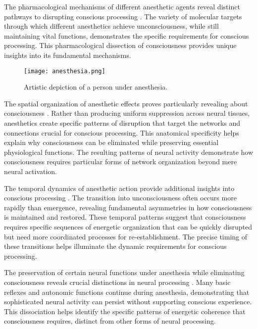 The pharmacological mechanisms of different anesthetic agents reveal distinct pathways to disrupting conscious processing \cite{Uhrig2018}. The variety of molecular targets through which different anesthetics achieve unconsciousness, while still maintaining vital functions, demonstrates the specific requirements for conscious processing. This pharmacological dissection of consciousness provides unique insights into its fundamental mechanisms.

\begin{figure}[h]
    \centering
    \texttt{[image: anesthesia.png]}

    \caption{Artistic depiction of a person under anesthesia. }
\end{figure}

The spatial organization of anesthetic effects proves particularly revealing about consciousness \cite{Lewis2012}. Rather than producing uniform suppression across neural tissues, anesthetics create specific patterns of disruption that target the networks and connections crucial for conscious processing. This anatomical specificity helps explain why consciousness can be eliminated while preserving essential physiological functions. The resulting patterns of neural activity demonstrate how consciousness requires particular forms of network organization beyond mere neural activation.

The temporal dynamics of anesthetic action provide additional insights into conscious processing \cite{Purdon2013}. The transition into unconsciousness often occurs more rapidly than emergence, revealing fundamental asymmetries in how consciousness is maintained and restored. These temporal patterns suggest that consciousness requires specific sequences of energetic organization that can be quickly disrupted but need more coordinated processes for re-establishment. The precise timing of these transitions helps illuminate the dynamic requirements for conscious processing.

The preservation of certain neural functions under anesthesia while eliminating consciousness reveals crucial distinctions in neural processing \cite{Sanders2012}. Many basic reflexes and autonomic functions continue during anesthesia, demonstrating that sophisticated neural activity can persist without supporting conscious experience. This dissociation helps identify the specific patterns of energetic coherence that consciousness requires, distinct from other forms of neural processing.

